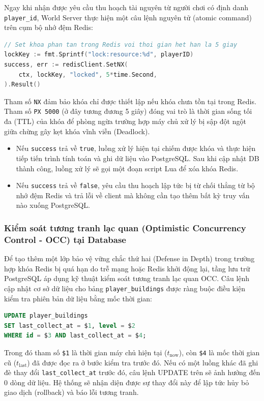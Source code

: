 \documentclass[../Project.tex]{subfiles}
\begin{document}
Ngay khi nhận được yêu cầu thu hoạch tài nguyên từ người chơi có định danh \texttt{player\_id}, World Server thực hiện một câu lệnh nguyên tử (atomic command) trên cụm bộ nhớ đệm Redis:
\begin{lstlisting}[language=Go, breaklines=true]
// Set khoa phan tan trong Redis voi thoi gian het han la 5 giay
lockKey := fmt.Sprintf("lock:resource:%d", playerID)
success, err := redisClient.SetNX(
    ctx, lockKey, "locked", 5*time.Second,
).Result()
\end{lstlisting}
Tham số \texttt{NX} đảm bảo khóa chỉ được thiết lập nếu khóa chưa tồn tại trong Redis. Tham số \texttt{PX 5000} (ở đây tương đương 5 giây) đóng vai trò là thời gian sống tối đa (TTL) của khóa để phòng ngừa trường hợp máy chủ xử lý bị sập đột ngột giữa chừng gây kẹt khóa vĩnh viễn (Deadlock).
\begin{itemize}
    \item Nếu \texttt{success} trả về \texttt{true}, luồng xử lý hiện tại chiếm được khóa và thực hiện tiếp tiến trình tính toán và ghi dữ liệu vào PostgreSQL. Sau khi cập nhật DB thành công, luồng xử lý sẽ gọi một đoạn script Lua để xóa khóa Redis.
    \item Nếu \texttt{success} trả về \texttt{false}, yêu cầu thu hoạch lập tức bị từ chối thẳng từ bộ nhớ đệm Redis và trả lỗi về client mà không cần tạo thêm bất kỳ truy vấn nào xuống PostgreSQL.
\end{itemize}

\subsubsection{Kiểm soát tương tranh lạc quan (Optimistic Concurrency Control - OCC) tại Database}
Để tạo thêm một lớp bảo vệ vững chắc thứ hai (Defense in Depth) trong trường hợp khóa Redis bị quá hạn do trễ mạng hoặc Redis khởi động lại, tầng lưu trữ PostgreSQL áp dụng kỹ thuật kiểm soát tương tranh lạc quan OCC. Câu lệnh cập nhật cơ sở dữ liệu cho bảng \texttt{player\_buildings} được ràng buộc điều kiện kiểm tra phiên bản dữ liệu bằng mốc thời gian:
\begin{lstlisting}[language=SQL, breaklines=true]
UPDATE player_buildings 
SET last_collect_at = $1, level = $2 
WHERE id = $3 AND last_collect_at = $4;
\end{lstlisting}
Trong đó tham số \texttt{\$1} là thời gian máy chủ hiện tại (\(t_{\text{now}}\)), còn \texttt{\$4} là mốc thời gian cũ (\(t_{\text{last}}\)) đã được đọc ra ở bước kiểm tra trước đó. Nếu có một luồng khác đã ghi đè thay đổi \texttt{last\_collect\_at} trước đó, câu lệnh UPDATE trên sẽ ảnh hưởng đến 0 dòng dữ liệu. Hệ thống sẽ nhận diện được sự thay đổi này để lập tức hủy bỏ giao dịch (rollback) và báo lỗi tương tranh.
\end{document}
